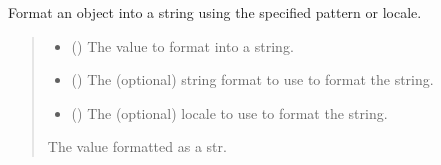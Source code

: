 \documentclass[letterpaper,10pt,english]{sphinxmanual}
\begin{document}
\begin{fulllineitems}
\begin{fulllineitems}
\label{\detokenize{apache_commons_validator_python.routines:apache_commons_validator_python.routines.abstract_format_validator.AbstractFormatValidator.format}}
\pysigstartsignatures
{}
\pysigstopsignatures
\sphinxAtStartPar
Format an object into a string using the specified pattern or locale.
\begin{quote}\begin{description}
\begin{itemize}
\item {} 
\sphinxAtStartPar
{} () \textendash{} The value to format into a string.

\item {} 
\sphinxAtStartPar
{} () \textendash{} The (optional) string format to use to format the string.

\item {} 
\sphinxAtStartPar
{} () \textendash{} The (optional) locale to use to format the string.

\end{itemize}

\sphinxAtStartPar
The value formatted as a str.

\end{description}\end{quote}

\end{fulllineitems}



\end{fulllineitems}
\end{document}
